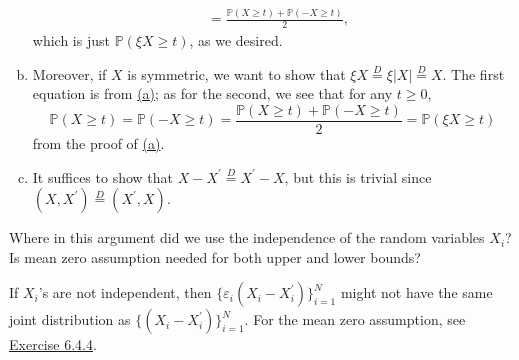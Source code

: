 \begin{answer}
\begin{enumerate}[(a)]
\[\begin{split}
				       & = \frac{\mathbb{P} (X \geq t) + \mathbb{P} (-X \geq t)}{2},
			      \end{split}
		      \]
		      which is just \(\mathbb{P} (\xi X \geq t)\), as we desired.
		\item Moreover, if \(X\) is symmetric, we want to show that \(\xi X \overset{D}{=} \xi \lvert X \rvert \overset{D}{=} X\). The first equation is from \hyperref[ex6.4.1:a]{(a)}; as for the second, we see that for any \(t \geq 0\),
		      \[
			      \mathbb{P} (X \geq t)
			      = \mathbb{P} (-X \geq t)
			      = \frac{\mathbb{P} (X \geq t) + \mathbb{P} (-X \geq t)}{2}
			      = \mathbb{P} (\xi X \geq t)
		      \]
		      from the proof of \hyperref[ex6.4.1:a]{(a)}.
		\item It suffices to show that \(X - X^{\prime} \overset{D}{=} X^{\prime} - X\), but this is trivial since \((X, X^{\prime} ) \overset{D}{=} (X^{\prime} , X)\).
	\end{enumerate}
\end{answer}

\begin{problem*}[Exercise 6.4.3]\label{ex6.4.3}
	Where in this argument did we use the independence of the random variables \(X_i\)? Is mean zero assumption needed for both upper and lower bounds?
\end{problem*}
\begin{answer}
	If \(X_i\)'s are not independent, then \(\{ \varepsilon _i (X_i - X_i^{\prime} )\}_{i=1}^N \) might not have the same joint distribution as \(\{ (X_i - X_i^{\prime} ) \}_{i = 1}^N \). For the mean zero assumption, see \hyperref[ex6.4.4]{Exercise 6.4.4}.
\end{answer}

